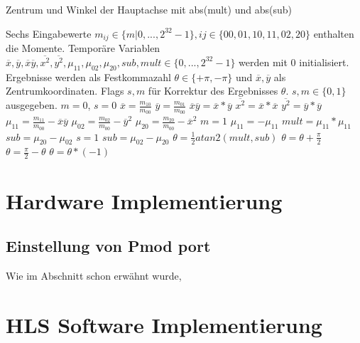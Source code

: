 \documentclass[a4paper]{report}
\begin{document}
\begin{algorithm}
\caption{Zentrum und Winkel der Hauptachse mit abs(mult) und abs(sub)}
\label{Momente}
\begin{algorithmic}[1]
\Require Sechs Eingabewerte {$m_{ij}\in\{m|0,...,2^{32}-1\},ij\in\{00,01,10,11,02,20\}$} enthalten die Momente. Temporäre Variablen $\overline{x},\overline{y},\overline{x}\overline{y},\overline{x^2},\overline{y^2},\mu_{11},\mu_{02},\mu_{20},sub,mult\in \{0,...,2^{32}-1\}$ werden mit 0 initialisiert. Ergebnisse werden als Festkommazahl $\theta \in \{+\pi, -\pi\}$ und  $\overline{x},\overline{y}$ als Zentrumkoordinaten. Flags $s,m$ für Korrektur des Ergebnisses $\theta$. {$s,m\in\{0,1\}$} ausgegeben.
\State $m = 0$, $s = 0$
	\State $\overline{x} = \frac{m_{10}}{m_{00}}$
	\State $\overline{y} = \frac{m_{01}}{m_{00}}$
	\State $\overline{x}\overline{y} = \overline{x} * \overline{y}$
	\State $\overline{x^2} = \overline{x} * \overline{x}$
	\State $\overline{y^2} = \overline{y} * \overline{y}$
	\State $\mu_{11} = \frac{m_{11}}{m_{00}} - \overline{x}\overline{y} $
	\State $\mu_{02} = \frac{m_{02}}{m_{00}} - \overline{y}^2 $
	\State $\mu_{20} = \frac{m_{20}}{m_{00}} - \overline{x}^2 $	
		\State $m = 1$
		\State $\mu_{11} = -\mu_{11}$
	\EndIf
	\State $mult = \mu_{11}* \mu_{11}$
		\State $sub = \mu_{20}-\mu_{02}$
		\State $s = 1$
	\Else
		\State $sub = \mu_{02}-\mu_{20}$
    \EndIf  
	\State $\theta = \frac{1}{2} atan2(mult, sub)$
\EndIf
{}
	\State $\theta = \theta + \frac{\pi}{2}$
	\State $\theta = \frac{\pi}{2} - \theta$
	\State $\theta= \theta*(-1)$
\EndIf  


\end{algorithmic}
\end{algorithm}

\newpage
\section{Hardware Implementierung}

\subsection{Einstellung von Pmod port}
Wie im Abschnitt \textbf{} schon erwähnt wurde, 


\section{HLS Software Implementierung}
\end{document}
